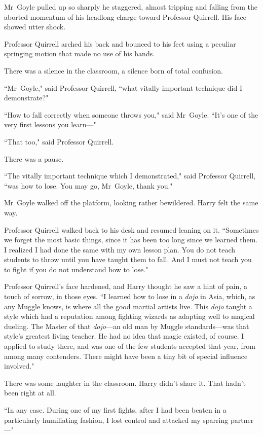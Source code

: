 Mr~Goyle pulled up so sharply he staggered, almost tripping and falling from the aborted momentum of his headlong charge toward Professor Quirrell. His face showed utter shock.

Professor Quirrell arched his back and bounced to his feet using a peculiar springing motion that made no use of his hands.

There was a silence in the classroom, a silence born of total confusion.

``Mr~Goyle," said Professor Quirrell, ``what vitally important technique did I demonstrate?"

``How to fall correctly when someone throws you," said Mr~Goyle. ``It's one of the very first lessons you learn—"

``That too," said Professor Quirrell.

There was a pause.

``The vitally important technique which I demonstrated," said Professor Quirrell, ``was how to lose. You may go, Mr~Goyle, thank you."

Mr~Goyle walked off the platform, looking rather bewildered. Harry felt the same way.

Professor Quirrell walked back to his desk and resumed leaning on it. ``Sometimes we forget the most basic things, since it has been too long since we learned them. I realized I had done the same with my own lesson plan. You do not teach students to throw until you have taught them to fall. And I must not teach you to fight if you do not understand how to lose."

Professor Quirrell's face hardened, and Harry thought he saw a hint of pain, a touch of sorrow, in those eyes. ``I learned how to lose in a \emph{dojo} in Asia, which, as any Muggle knows, is where all the good martial artists live. This \emph{dojo} taught a style which had a reputation among fighting wizards as adapting well to magical dueling. The Master of that \emph{dojo}—an old man by Muggle standards—was that style's greatest living teacher. He had no idea that magic existed, of course. I applied to study there, and was one of the few students accepted that year, from among many contenders. There might have been a tiny bit of special influence involved."

There was some laughter in the classroom. Harry didn't share it. That hadn't been right at all.

``In any case. During one of my first fights, after I had been beaten in a particularly humiliating fashion, I lost control and attacked my sparring partner—"

